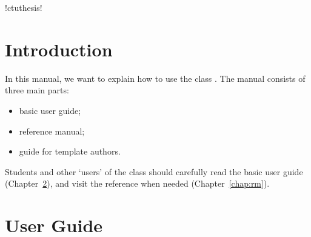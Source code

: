 \documentclass[twoside,11pt]{ctuthesis}
\theoremstyle{plain}
\theoremstyle{definition}
\theoremstyle{note}
\begin{document}
\newcommand\ctuclsname{\leavevmode\copy\ctuclsnamebox}
\newsavebox\ctuclsnamebox
\begin{lrbox}{\ctuclsnamebox}
\ctulst!ctuthesis!
\end{lrbox}

\maketitle

\chapter{Introduction}




In this manual, we want to explain how to use the class \ctuclsname.
The manual consists of three main parts:

\begin{itemize}
\item basic user guide;
\item reference manual;
\item guide for template authors.
\end{itemize}

Students and other `users' of the class should carefully read the basic user guide (Chapter~\ref{chap:ug}),
 and visit the reference when needed (Chapter~\ref{chap:rm}).





\chapter{User Guide}
\label{chap:ug}
\end{document}
